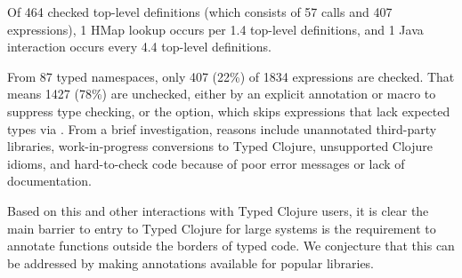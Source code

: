 Of 464 checked top-level definitions (which consists of
57  calls and 407  expressions),
1 HMap lookup occurs per 1.4 top-level definitions,
and 1 Java interaction occurs every 4.4 top-level definitions.

From 87 typed namespaces,
only 407 (22\%) of 1834  expressions are checked.
That means 1427 (78\%) are unchecked, either by an explicit  annotation
or  macro to suppress type checking,
or the  option, which skips  expressions
that lack expected types via .
From a brief investigation,
reasons include unannotated third-party libraries,
work-in-progress conversions to Typed Clojure,
unsupported Clojure idioms, 
and hard-to-check code 
because of poor error messages or lack of documentation.

Based on this and other interactions with Typed Clojure users,
it is clear the main barrier to entry to Typed Clojure for large systems is the requirement
to annotate functions outside the borders of typed code.
We conjecture that this can be addressed by making annotations available for popular libraries.


